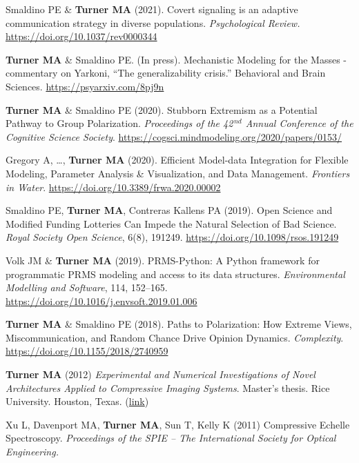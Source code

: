 \documentclass[letterpaper,11pt,oneside]{article}
\begin{document}
\begin{hangparas}{0.25in}{1}
  Smaldino PE \& \textbf{Turner MA} (2021). Covert signaling is an adaptive communication strategy in diverse populations. \emph{Psychological Review.} \url{https://doi.org/10.1037/rev0000344}

  \textbf{Turner MA} \& Smaldino PE. (In press). Mechanistic Modeling for the Masses - 
  commentary on Yarkoni, ``The generalizability crisis.''
  Behavioral and Brain Sciences. \url{https://psyarxiv.com/8pj9n}

  \textbf{Turner MA} \& Smaldino PE (2020). Stubborn Extremism as a Potential Pathway to Group Polarization. \emph{Proceedings of the 42$^{\,nd}$ Annual Conference of the Cognitive Science Society}. \url{https://cogsci.mindmodeling.org/2020/papers/0153/}

    Gregory A, \ldots, \textbf{Turner MA} (2020). Efficient Model-data Integration for Flexible Modeling, Parameter Analysis \& Visualization, and Data Management. \emph{Frontiers in Water}. 
    \url{https://doi.org/10.3389/frwa.2020.00002}

    Smaldino PE, \textbf{Turner MA}, Contreras Kallens PA (2019). Open Science and Modified Funding Lotteries Can Impede the Natural Selection of Bad Science. \emph{Royal Society Open Science}, 6(8), 191249. \url{https://doi.org/10.1098/rsos.191249}

    Volk JM \& \textbf{Turner MA} (2019). PRMS-Python: A Python framework for programmatic PRMS modeling and access to its data structures. \emph{Environmental Modelling and Software}, 114, 152–165. \url{https://doi.org/10.1016/j.envsoft.2019.01.006}

    \textbf{Turner MA} \& Smaldino PE (2018). Paths to Polarization: How Extreme Views,
    Miscommunication, and Random Chance Drive Opinion Dynamics. \emph{Complexity}. \url{https://doi.org/10.1155/2018/2740959}
    
  \textbf{Turner MA} (2012) \emph{Experimental and Numerical Investigations of Novel Architectures Applied to Compressive Imaging Systems}. Master's thesis. Rice University. Houston, Texas. (\href{https://www.researchgate.net/publication/274720620_Experimental_and_Numerical_In vestigations_of_Novel_Architectures_Applied_to_Compressive_Imaging_Systems}{link})

    Xu L, Davenport MA, \textbf{Turner MA}, Sun T, Kelly K (2011) Compressive Echelle Spectroscopy. \emph{Proceedings of the SPIE – The International Society for Optical Engineering.}


\end{hangparas}
\end{document}
